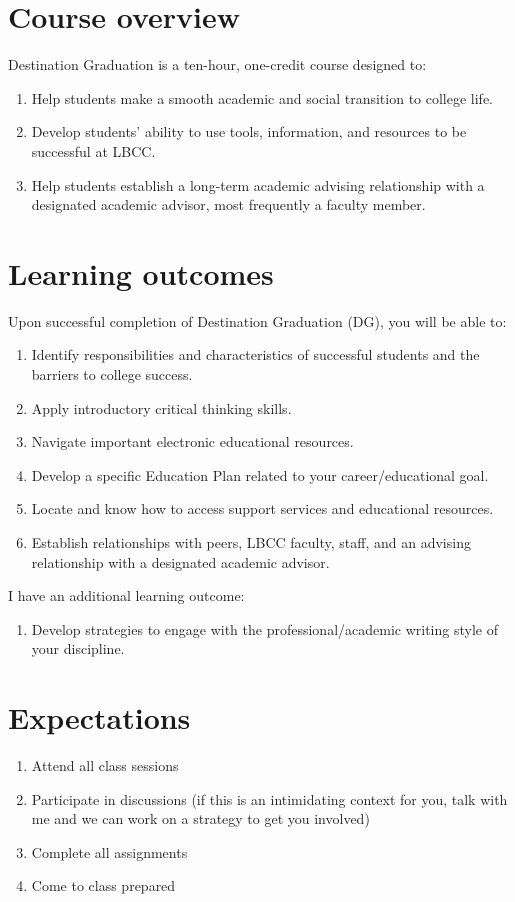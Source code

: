 \documentclass[12pt,article,oneside]{memoir}
\begin{document}
\section{Course overview}
Destination Graduation is a ten-hour, one-credit course designed to:
\begin{enumerate}
 \item Help students make a smooth academic and social transition to college life.
 \item Develop students' ability to use tools, information, and resources to be successful at LBCC.
 \item Help students establish a long-term academic advising relationship with a designated academic advisor, most frequently a faculty member.
\end{enumerate}

\section{Learning outcomes}
Upon successful completion of Destination Graduation (DG), you will be able to:
\begin{enumerate}
 \item Identify responsibilities and characteristics of successful students and the barriers to college success.
 \item Apply introductory critical thinking skills.
 \item Navigate important electronic educational resources.
 \item Develop a specific Education Plan related to your career/educational goal.
 \item Locate and know how to access support services and educational resources.
 \item Establish relationships with peers, LBCC faculty, staff, and an advising relationship with a designated academic advisor.
\end{enumerate}

I have an additional learning outcome:
\begin{enumerate}
  \item Develop strategies to engage with the professional/academic writing style of your discipline.
\end{enumerate}

\section{Expectations}
\begin{enumerate}
 \item Attend all class sessions
 \item Participate in discussions (if this is an intimidating context for you, talk with me and we can work on a strategy to get you involved)
 \item Complete all assignments
 \item Come to class prepared
\end{enumerate}
\end{document}
